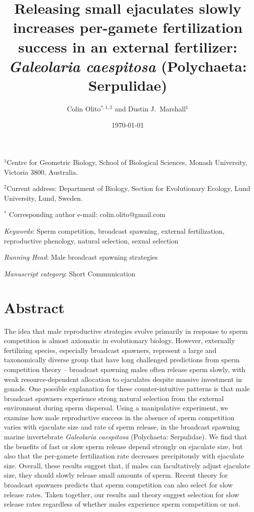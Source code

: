 \documentclass{article}
\title{Releasing small ejaculates slowly increases per-gamete fertilization success in an external fertilizer: \textit{Galeolaria caespitosa} (Polychaeta: Serpulidae)}
\author{Colin Olito$^{\ast,1,2}$ and Dustin J.~Marshall$^{1}$}
\date{\today}
\begin{document}
\maketitle


\noindent{} $^1$Centre for Geometric Biology, School of Biological Sciences, Monash University, Victoria 3800, Australia.

\noindent{} $^2$Current address: Department of Biology, Section for Evolutionary Ecology, Lund University, Lund, Sweden.

\noindent{} $^\ast$ Corresponding author e-mail: colin.olito@gmail.com

\bigskip

\noindent{} \textit{Keywords}: Sperm competition, broadcast spawning, external fertilization, reproductive phenology, natural selection, sexual selection
\bigskip

\noindent{} \textit{Running Head}: Male broadcast spawning strategies

\bigskip

\noindent{} \textit{Manuscript category}: Short Communication

\bigskip


\linenumbers
\modulolinenumbers[1]
\renewcommand\linenumberfont{\normalfont\small}
\newpage{}



\section{Abstract}

\noindent{} The idea that male reproductive strategies evolve primarily in response to sperm competition is almost axiomatic in evolutionary biology. However, externally fertilizing species, especially broadcast spawners, represent a large and taxonomically diverse group that have long challenged predictions from sperm competition theory -- broadcast spawning males often release sperm slowly, with weak resource-dependent allocation to ejaculates despite massive investment in gonads. One possible explanation for these counter-intuitive patterns is that male broadcast spawners experience strong natural selection from the external environment during sperm dispersal. Using a manipulative experiment, we examine how male reproductive success in the absence of sperm competition varies with ejaculate size and rate of sperm release, in the broadcast spawning marine invertebrate \textit{Galeolaria caespitosa} (Polychaeta: Serpulidae). We find that the benefits of fast or slow sperm release depend strongly on ejaculate size, but also that the per-gamete fertilization rate decreases precipitously with ejaculate size. Overall, these results suggest that, if males can facultatively adjust ejaculate size, they should slowly release small amounts of sperm. Recent theory for broadcast spawners predicts that sperm competition can also select for slow release rates. Taken together, our results and theory suggest selection for slow release rates regardless of whether males experience sperm competition or not.
\end{document}
